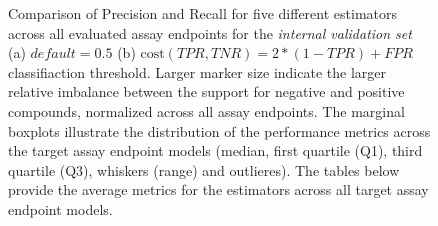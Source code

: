 \begin{figure}[h]
\begin{subfigure}[b]{0.48\textwidth}
        \caption{}
        \label{fig:hitcall_classification_Feature_Selection_XGBClassifier_val_optimal_macro_avg}
    \end{subfigure}
    \caption{Comparison of Precision and Recall for five different estimators across all evaluated assay endpoints for the \emph{internal validation set} (a)  $default = 0.5$  (b) $\text{cost}(TPR, TNR) = 2 * (1 - TPR) + FPR$ classifiaction threshold. Larger marker size indicate the larger relative imbalance between the support for negative and positive compounds, normalized across all assay endpoints. The marginal boxplots illustrate the distribution of the performance metrics across the target assay endpoint models (median, first quartile (Q1), third quartile (Q3), whiskers (range) and outlieres). The tables below provide the average metrics for the estimators across all target assay endpoint models.}
    \label{fig:hitcall_classification_Feature_Selection_XGBClassifier_val_default_optimal_macro_avg}
  \end{figure}






\newpage

